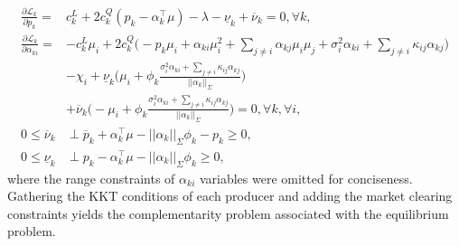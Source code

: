 \documentclass{article}
\begin{document}
\begin{align*}
\frac{\partial \mathcal{L}_k}{\partial p_k} =& c_k^L + 2 c_k^Q (p_k - \alpha_k^\top \mu) - \lambda - \underline{\nu}_k + \overline{\nu}_k = 0, \forall k,\\
\frac{\partial \mathcal{L}_k}{\partial \alpha_{ki}} =& - c_k^L \mu_i + 2 c_k^Q\Big(- p_k \mu_i + \alpha_{ki}\mu_i^2 + \sum_{j \ne i} \alpha_{kj} \mu_i \mu_j + \sigma_i^2 \alpha_{ki} + \sum_{j \ne i} \kappa_{ij} \alpha_{kj}\Big) \\
&- \chi_i + \underline{\nu}_k \Big(\mu_i + \phi_k \frac{\sigma_i^2 \alpha_{ki} + \sum_{j \ne i} \kappa_{ij} \alpha_{kj}}{||\alpha_k||_{\Sigma}}\Big)\\
&+ \overline{\nu}_k \Big(-\mu_i + \phi_k \frac{\sigma_i^2 \alpha_{ki} + \sum_{j \ne i} \kappa_{ij} \alpha_{kj}}{||\alpha_k||_{\Sigma}}\Big) = 0, \forall k, \forall i,\\
0 \le \overline{\nu}_k &\perp \overline{p}_k + \alpha_k^\top \mu - ||\alpha_k||_{\Sigma} \phi_k - p_k \ge 0,\\
0 \le \underline{\nu}_k & \perp p_k - \alpha_k^\top \mu - ||\alpha_k||_{\Sigma}\phi_k \ge 0,
\end{align*}
where the range constraints of $\alpha_{ki}$ variables were omitted for conciseness. Gathering the KKT conditions of each producer and adding the market clearing constraints yields the complementarity problem associated with the equilibrium problem.
\end{document}
